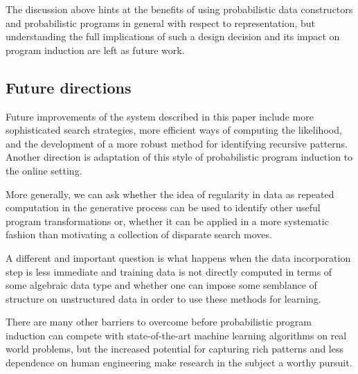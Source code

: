 \documentclass[a4paper,10pt]{article}
\begin{document}
The discussion above hints at the benefits of using probabilistic data constructors and probabilistic programs in general with respect to representation, but understanding the full implications of such a design decision and its impact on program induction are left as future work.

\subsection{Future directions}

Future improvements of the system described in this paper include more sophisticated search strategies, more efficient ways of computing the likelihood, and the development of a more robust method for identifying recursive patterns.  Another direction is adaptation of this style of probabilistic program induction to the online setting.  

More generally, we can ask whether the idea of regularity in data as repeated computation in the generative process can be used to identify other useful program transformations or, whether it can be applied in a more systematic fashion than motivating a collection of disparate search moves.  

A different and important question is what happens when the data incorporation step is less immediate and training data is not directly computed in terms of some algebraic data type and whether one can impose some semblance of structure on unstructured data in order to use these methods for learning.  

There are many other barriers to overcome before probabilistic program induction can compete with state-of-the-art machine learning algorithms on real world problems, but the increased potential for capturing rich patterns and less dependence on human engineering make research in the subject a worthy pursuit.


\end{document}
